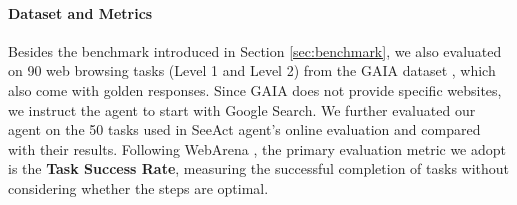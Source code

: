 \documentclass[11pt]{article}
\begin{document}
\paragraph{Dataset and Metrics}
Besides the benchmark introduced in Section \ref{sec:benchmark}, we also evaluated on 90 web browsing tasks (Level 1 and Level 2) from the GAIA dataset \citep{mialon2023gaia}, which also come with golden responses. Since GAIA does not provide specific websites, we instruct the agent to start with Google Search. We further evaluated our agent on the 50 tasks used in SeeAct agent's online evaluation \cite{zheng2024gpt} and compared with their results. Following WebArena \citep{zhou2023webarena}, the primary evaluation metric we adopt is the \textbf{Task Success Rate}, measuring the successful completion of tasks without considering whether the steps are optimal. %







\end{document}
